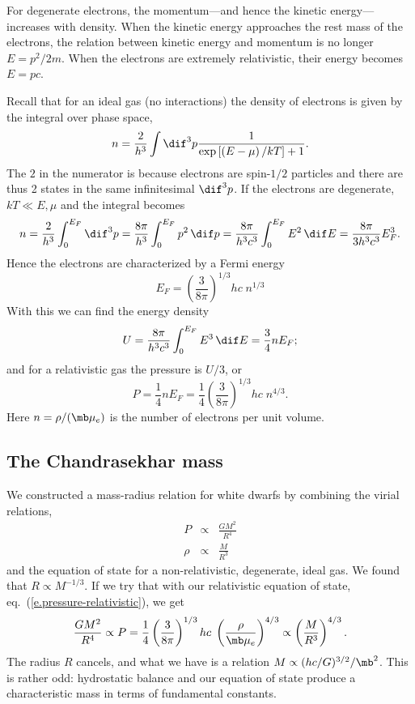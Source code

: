 For degenerate electrons, the momentum---and hence the kinetic energy---increases with density.  When the kinetic energy approaches the rest mass of the electrons, the relation between kinetic energy and momentum is no longer $E = p^{2}/2m$.  When the electrons are extremely relativistic, their energy becomes $E = p c$.

Recall that for an ideal gas (no interactions) the density of electrons is given by the integral over phase space,
\[
  n = \frac{2}{h^{3}} \int \dif^{3}p \frac{1}{\exp\left[\left(E-\mu\right)/kT\right]+1}.
\]
The $2$ in the numerator is because electrons are spin-$1/2$ particles and there are thus 2 states in the same infinitesimal $\dif^{3}p$.  If the electrons are degenerate, $kT \ll E,\mu$ and the integral becomes
\[
  n = \frac{2}{h^{3}}\int_{0}^{E_{F}} \dif^{3}p = \frac{8\pi}{h^{3}} \int_{0}^{E_{F}} p^{2}\,\dif p = \frac{8\pi}{h^{3}c^{3}} \int_{0}^{E_{F}} E^{2}\,\dif E = \frac{8\pi}{3h^{3}c^{3}} E_{F}^{3}.
\]
Hence the electrons are characterized by a Fermi energy
\begin{equation}\label{e.fermi}
	E_{F} = \left(\frac{3}{8\pi}\right)^{1/3}hc\; n^{1/3}
\end{equation}
With this we can find the energy density
\[
  U = \frac{8\pi}{h^{3}c^{3}}\int_{0}^{E_{F}} E^{3}\,\dif E = \frac{3}{4} n E_{F};
\]
and for a relativistic gas the pressure is $U/3$, or
\begin{equation}\label{e.pressure-relativistic}
  P = \frac{1}{4}n E_{F} = \frac{1}{4}\left(\frac{3}{8\pi}\right)^{1/3}hc\; n^{4/3}.
\end{equation}
Here $n = \rho/(\mb\mu_{e})$ is the number of electrons per unit volume.

\subsection{The Chandrasekhar mass}
We constructed a mass-radius relation for white dwarfs by combining the virial relations,
\begin{eqnarray*}
   P    &\propto& \frac{GM^{2}}{R^{4}}\\
   \rho &\propto& \frac{M}{R^{3}}
\end{eqnarray*}
and the equation of state for a non-relativistic, degenerate, ideal gas.  We found that $R\propto M^{-1/3}$.  If we try that with our relativistic equation of state, eq.~(\ref{e.pressure-relativistic}), we get
\[
	\frac{GM^{2}}{R^{4}} \propto P = \frac{1}{4}\left(\frac{3}{8\pi}\right)^{1/3}hc\; \left(\frac{\rho}{\mb\mu_{e}}\right)^{4/3} \propto \left(\frac{M}{R^{3}}\right)^{4/3}.
\]
The radius $R$ cancels, and what we have is a relation $M\propto (hc/G)^{3/2}/\mb^{2}$.  This is rather odd: hydrostatic balance and our equation of state produce a characteristic mass in terms of fundamental constants.

